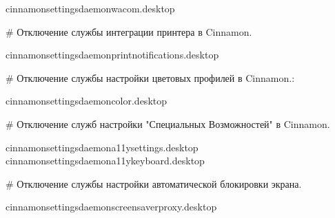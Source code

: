 \documentclass[letterpaper,10pt,russian,openany]{sphinxmanual}
\begin{document}
\begin{sphinxVerbatim}[commandchars=\\\{\}]
  \PYGZgt{}\PYGZgt{} cinnamon\PYGZhy{}settings\PYGZhy{}daemon\PYGZhy{}wacom.desktop
\end{sphinxVerbatim}

\sphinxAtStartPar
\# Отключение службы интеграции принтера в Cinnamon.

\begin{sphinxVerbatim}[commandchars=\\\{\}]
  \PYGZgt{}\PYGZgt{} cinnamon\PYGZhy{}settings\PYGZhy{}daemon\PYGZhy{}print\PYGZhy{}notifications.desktop
\end{sphinxVerbatim}

\sphinxAtStartPar
\# Отключение службы настройки цветовых профилей в Cinnamon.:

\begin{sphinxVerbatim}[commandchars=\\\{\}]
  \PYGZgt{}\PYGZgt{} cinnamon\PYGZhy{}settings\PYGZhy{}daemon\PYGZhy{}color.desktop
\end{sphinxVerbatim}

\sphinxAtStartPar
\# Отключение служб настройки "Специальных Возможностей" в Cinnamon.

\begin{sphinxVerbatim}[commandchars=\\\{\}]
  \PYGZgt{}\PYGZgt{} cinnamon\PYGZhy{}settings\PYGZhy{}daemon\PYGZhy{}a11y\PYGZhy{}settings.desktop
  \PYGZgt{}\PYGZgt{} cinnamon\PYGZhy{}settings\PYGZhy{}daemon\PYGZhy{}a11y\PYGZhy{}keyboard.desktop
\end{sphinxVerbatim}

\sphinxAtStartPar
\# Отключение службы настройки автоматической блокировки экрана.

\begin{sphinxVerbatim}[commandchars=\\\{\}]
  \PYGZgt{}\PYGZgt{} cinnamon\PYGZhy{}settings\PYGZhy{}daemon\PYGZhy{}screensaver\PYGZhy{}proxy.desktop
\end{sphinxVerbatim}
\end{document}
